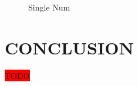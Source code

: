 \documentclass[12pt, conference]{ieeeconf}
\newcommand{\todo}{\colorbox{red}{TODO}}
\begin{document}
\begin{figure}[H]
	\centering
	\caption{Single Num}
	\label{fig:single_num}
\end{figure}

\section{CONCLUSION}

\todo



\printbibliography
\end{document}
